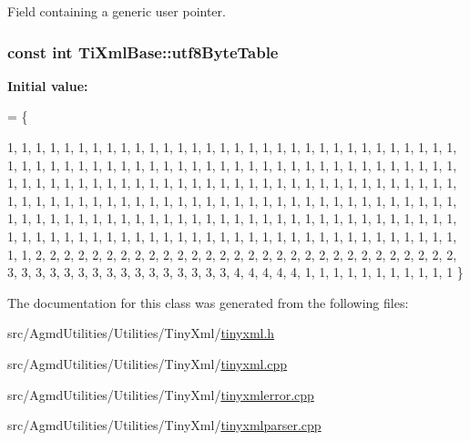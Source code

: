 Field containing a generic user pointer. 

\hypertarget{class_ti_xml_base_ac8c86058137bdb4b413c3eca58f2d467}{
\subsubsection[{utf8\+Byte\+Table}]{\setlength{\rightskip}{0pt plus 5cm}const int Ti\+Xml\+Base\+::utf8\+Byte\+Table\hspace{0.3cm}{\ttfamily [static]}}}\label{class_ti_xml_base_ac8c86058137bdb4b413c3eca58f2d467}
{\bfseries Initial value\+:}
\begin{DoxyCode}
= 
\{
    
        1,    1,    1,    1,    1,    1,    1,    1,    1,    1,    1,    1,    1,    1,    1,    1,    
        1,    1,    1,    1,    1,    1,    1,    1,    1,    1,    1,    1,    1,    1,    1,    1,    
        1,    1,    1,    1,    1,    1,    1,    1,    1,    1,    1,    1,    1,    1,    1,    1,    
        1,    1,    1,    1,    1,    1,    1,    1,    1,    1,    1,    1,    1,    1,    1,    1,    
        1,    1,    1,    1,    1,    1,    1,    1,    1,    1,    1,    1,    1,    1,    1,    1,    
        1,    1,    1,    1,    1,    1,    1,    1,    1,    1,    1,    1,    1,    1,    1,    1,    
        1,    1,    1,    1,    1,    1,    1,    1,    1,    1,    1,    1,    1,    1,    1,    1,    
        1,    1,    1,    1,    1,    1,    1,    1,    1,    1,    1,    1,    1,    1,    1,    1,    
        1,    1,    1,    1,    1,    1,    1,    1,    1,    1,    1,    1,    1,    1,    1,    1,    
        1,    1,    1,    1,    1,    1,    1,    1,    1,    1,    1,    1,    1,    1,    1,    1,    
        1,    1,    1,    1,    1,    1,    1,    1,    1,    1,    1,    1,    1,    1,    1,    1,    
        1,    1,    1,    1,    1,    1,    1,    1,    1,    1,    1,    1,    1,    1,    1,    1,    
        1,    1,    2,    2,    2,    2,    2,    2,    2,    2,    2,    2,    2,    2,    2,    2,    
        2,    2,    2,    2,    2,    2,    2,    2,    2,    2,    2,    2,    2,    2,    2,    2,    
        3,    3,    3,    3,    3,    3,    3,    3,    3,    3,    3,    3,    3,    3,    3,    3,    
        4,    4,    4,    4,    4,    1,    1,    1,    1,    1,    1,    1,    1,    1,    1,    1    
\}
\end{DoxyCode}


The documentation for this class was generated from the following files\+:\begin{DoxyCompactItemize}
\item 
src/\+Agmd\+Utilities/\+Utilities/\+Tiny\+Xml/\hyperlink{tinyxml_8h}{tinyxml.\+h}\item 
src/\+Agmd\+Utilities/\+Utilities/\+Tiny\+Xml/\hyperlink{tinyxml_8cpp}{tinyxml.\+cpp}\item 
src/\+Agmd\+Utilities/\+Utilities/\+Tiny\+Xml/\hyperlink{tinyxmlerror_8cpp}{tinyxmlerror.\+cpp}\item 
src/\+Agmd\+Utilities/\+Utilities/\+Tiny\+Xml/\hyperlink{tinyxmlparser_8cpp}{tinyxmlparser.\+cpp}\end{DoxyCompactItemize}
